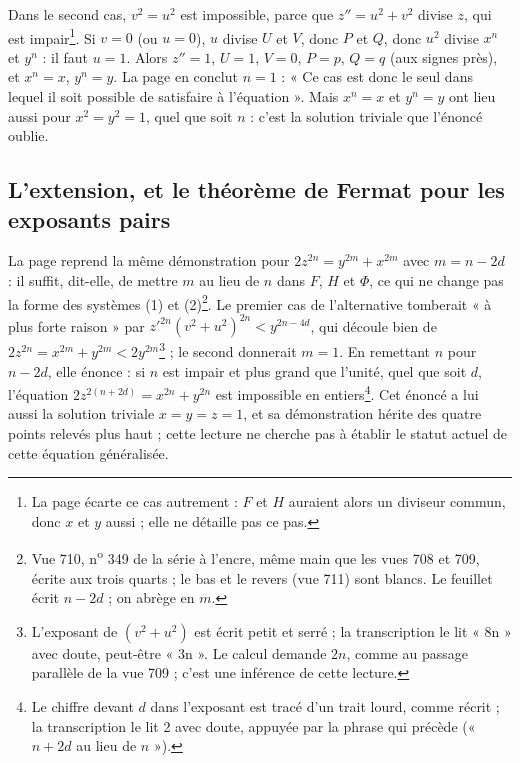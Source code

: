 \documentclass[11pt,a4paper]{article}
\begin{document}
Dans le second cas, $v^2=u^2$ est impossible, parce que $z''=u^2+v^2$ divise $z$, qui est impair\footnote{La page écarte ce cas autrement : $F$ et $H$ auraient alors un diviseur commun, donc $x$ et $y$ aussi ; elle ne détaille pas ce pas.}. Si $v=0$ (ou $u=0$), $u$ divise $U$ et $V$, donc $P$ et $Q$, donc $u^2$ divise $x^n$ et $y^n$ : il faut $u=1$. Alors $z''=1$, $U=1$, $V=0$, $P=p$, $Q=q$ (aux signes près), et $x^n=x$, $y^n=y$. La page en conclut $n=1$ : « Ce cas est donc le seul dans lequel il soit possible de satisfaire à l'équation ». Mais $x^n=x$ et $y^n=y$ ont lieu aussi pour $x^2=y^2=1$, quel que soit $n$ : c'est la solution triviale que l'énoncé oublie.

\subsection*{L'extension, et le théorème de Fermat pour les exposants pairs}

La page reprend la même démonstration pour $2z^{2n}=y^{2m}+x^{2m}$ avec $m=n-2d$ : il suffit, dit-elle, de mettre $m$ au lieu de $n$ dans $F$, $H$ et $\Phi$, ce qui ne change pas la forme des systèmes (1) et (2)\footnote{Vue 710, n\textsuperscript{o} 349 de la série à l'encre, même main que les vues 708 et 709, écrite aux trois quarts ; le bas et le revers (vue 711) sont blancs. Le feuillet écrit $n-2d$ ; on abrège en $m$.}. Le premier cas de l'alternative tomberait « à plus forte raison » par $z'^{2n}(v^2+u^2)^{2n}<y^{2n-4d}$, qui découle bien de $2z^{2n}=x^{2m}+y^{2m}<2y^{2m}$\footnote{L'exposant de $(v^2+u^2)$ est écrit petit et serré ; la transcription le lit « 8n » avec doute, peut-être « 3n ». Le calcul demande $2n$, comme au passage parallèle de la vue 709 ; c'est une inférence de cette lecture.} ; le second donnerait $m=1$. En remettant $n$ pour $n-2d$, elle énonce : si $n$ est impair et plus grand que l'unité, quel que soit $d$, l'équation $2z^{2(n+2d)}=x^{2n}+y^{2n}$ est impossible en entiers\footnote{Le chiffre devant $d$ dans l'exposant est tracé d'un trait lourd, comme récrit ; la transcription le lit 2 avec doute, appuyée par la phrase qui précède (« $n+2d$ au lieu de $n$ »).}. Cet énoncé a lui aussi la solution triviale $x=y=z=1$, et sa démonstration hérite des quatre points relevés plus haut ; cette lecture ne cherche pas à établir le statut actuel de cette équation généralisée.
\end{document}
